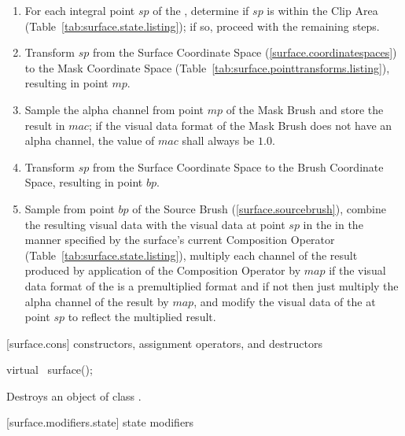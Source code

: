 \begin{enumerate}
\item For each integral point $sp$ of the \underlyingsurface, determine if $sp$ is within the Clip Area (Table~\ref{tab:surface.state.listing}); if so, proceed with the remaining steps.
\item Transform $sp$ from the Surface Coordinate Space (\ref{surface.coordinatespaces}) to the Mask Coordinate Space (Table~\ref{tab:surface.pointtransforms.listing}), resulting in point $mp$.
\item Sample the alpha channel from point $mp$ of the Mask Brush and store the result in $mac$; if the visual data format of the Mask Brush does not have an alpha channel, the value of $mac$ shall always be $1.0$.
\item Transform $sp$ from the Surface Coordinate Space to the Brush Coordinate Space, resulting in point $bp$.
\item Sample from point $bp$ of the Source Brush (\ref{surface.sourcebrush}), combine the resulting visual data with the visual data at point $sp$ in the \underlyingsurface in the manner specified by the surface's current Composition Operator (Table~\ref{tab:surface.state.listing}), multiply each channel of the result produced by application of the Composition Operator by $map$ if the visual data format of the \underlyingsurface is a premultiplied format and if not then just multiply the alpha channel of the result by $map$, and modify the visual data of the \underlyingsurface at point $sp$ to reflect the multiplied result.
\end{enumerate}

%
%
 [surface.cons] { constructors, assignment operators, and destructors}

\begin{itemdecl}
virtual ~surface();
\end{itemdecl}
\begin{itemdescr}
\pnum
\effects
Destroys an object of class .
\end{itemdescr}

 [surface.modifiers.state] { state modifiers}

